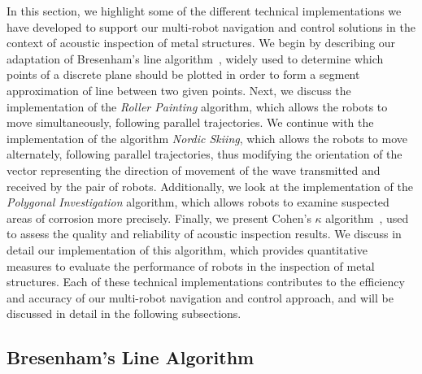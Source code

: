 In this section, we highlight some of the different technical implementations we have developed to support our multi-robot navigation and control solutions in the context of acoustic inspection of metal structures.
We begin by describing our adaptation of Bresenham's line algorithm~\cite{enwiki:1155124335}, widely used to determine which points of a discrete plane should be plotted in order to form a segment approximation of line between two given points.
Next, we discuss the implementation of the \textit{Roller Painting} algorithm, which allows the robots to move simultaneously, following parallel trajectories.
We continue with the implementation of the algorithm \textit{Nordic Skiing}, which allows the robots to move alternately, following parallel trajectories, thus modifying the orientation of the vector representing the direction of movement of the wave transmitted and received by the pair of robots.
Additionally, we look at the implementation of the \textit{Polygonal Investigation} algorithm, which allows robots to examine suspected areas of corrosion more precisely.
Finally, we present Cohen's $\kappa$ algorithm~\cite{enwiki:1130024730}, used to assess the quality and reliability of acoustic inspection results.
We discuss in detail our implementation of this algorithm, which provides quantitative measures to evaluate the performance of robots in the inspection of metal structures.
Each of these technical implementations contributes to the efficiency and accuracy of our multi-robot navigation and control approach, and will be discussed in detail in the following subsections.

\subsection*{Bresenham's Line Algorithm}\label{subsec:Bresenham}

